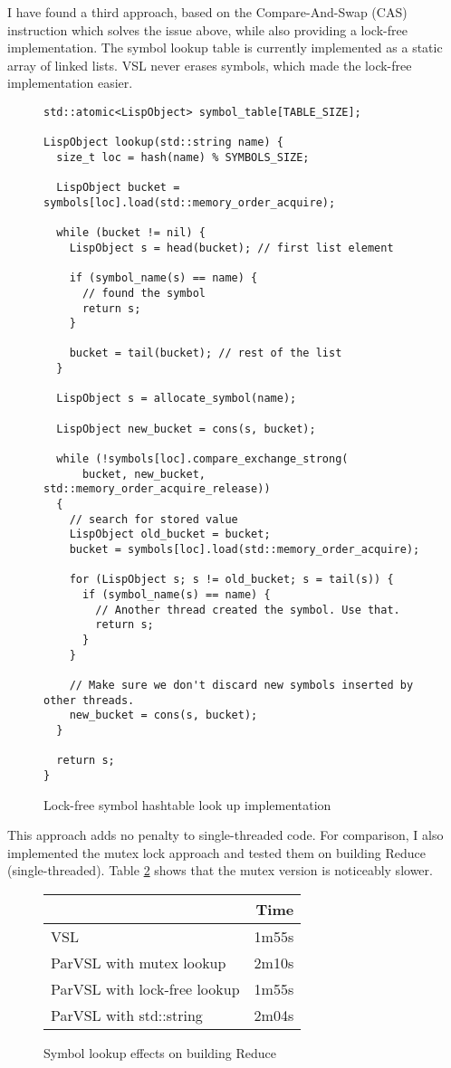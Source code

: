 I have found a third approach, based on the Compare-And-Swap (CAS) instruction which solves the issue
above, while also providing a lock-free implementation. The symbol lookup table is currently implemented
as a static array of linked lists. VSL never erases symbols, which made the lock-free implementation easier.

\begin{figure}
\begin{verbatim}
std::atomic<LispObject> symbol_table[TABLE_SIZE];

LispObject lookup(std::string name) {
  size_t loc = hash(name) % SYMBOLS_SIZE;

  LispObject bucket = symbols[loc].load(std::memory_order_acquire);

  while (bucket != nil) {
    LispObject s = head(bucket); // first list element

    if (symbol_name(s) == name) {
      // found the symbol
      return s;
    }

    bucket = tail(bucket); // rest of the list
  }

  LispObject s = allocate_symbol(name);

  LispObject new_bucket = cons(s, bucket);

  while (!symbols[loc].compare_exchange_strong(
      bucket, new_bucket, std::memory_order_acquire_release))
  {
    // search for stored value
    LispObject old_bucket = bucket;
    bucket = symbols[loc].load(std::memory_order_acquire);

    for (LispObject s; s != old_bucket; s = tail(s)) {
      if (symbol_name(s) == name) {
        // Another thread created the symbol. Use that.
        return s;
      }
    }

    // Make sure we don't discard new symbols inserted by other threads.
    new_bucket = cons(s, bucket);
  }

  return s;
}
\end{verbatim}
\caption{Lock-free symbol hashtable look up implementation}
\label{code:lockfree}
\end{figure}

This approach adds no penalty to single-threaded
code. For comparison, I also implemented the mutex lock approach and tested
them on building Reduce (single-threaded). Table \ref{fig:lockfree} shows that the mutex
version is noticeably slower.

\begin{figure}
  \centering
  \begin{tabular}{lr}
                               & Time \\
  \hline
  VSL                          & 1m55s \\
  ParVSL with mutex lookup     & 2m10s \\
  ParVSL with lock-free lookup & 1m55s \\
  ParVSL with std::string      & 2m04s
  \end{tabular}
  \label{fig:lockfree}
  \caption{Symbol lookup effects on building Reduce}
\end{figure}


